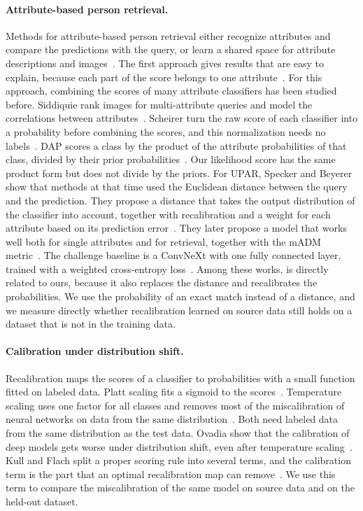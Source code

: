 \documentclass[10pt,twocolumn,letterpaper]{article}
\begin{document}
\paragraph{Attribute-based person retrieval.} Methods for attribute-based person retrieval either recognize attributes and compare the predictions with the query, or learn a shared space for attribute descriptions and images~\cite{upar}. The first approach gives results that are easy to explain, because each part of the score belongs to one attribute~\cite{upar}. For this approach, combining the scores of many attribute classifiers has been studied before. Siddiquie \etal rank images for multi-attribute queries and model the correlations between attributes~\cite{siddiquie}. Scheirer \etal turn the raw score of each classifier into a probability before combining the scores, and this normalization needs no labels~\cite{scheirer}. DAP scores a class by the product of the attribute probabilities of that class, divided by their prior probabilities~\cite{dap}. Our likelihood score has the same product form but does not divide by the priors. For UPAR, Specker and Beyerer show that methods at that time used the Euclidean distance between the query and the prediction. They propose a distance that takes the output distribution of the classifier into account, together with recalibration and a weight for each attribute based on its prediction error~\cite{specker21}. They later propose a model that works well both for single attributes and for retrieval, together with the mADM metric~\cite{specker23}. The challenge baseline is a ConvNeXt with one fully connected layer, trained with a weighted cross-entropy loss~\cite{upar23}. Among these works, \cite{specker21} is directly related to ours, because it also replaces the distance and recalibrates the probabilities. We use the probability of an exact match instead of a distance, and we measure directly whether recalibration learned on source data still holds on a dataset that is not in the training data.

\paragraph{Calibration under distribution shift.} Recalibration maps the scores of a classifier to probabilities with a small function fitted on labeled data. Platt scaling fits a sigmoid to the scores~\cite{platt}. Temperature scaling uses one factor for all classes and removes most of the miscalibration of neural networks on data from the same distribution~\cite{guo}. Both need labeled data from the same distribution as the test data. Ovadia \etal show that the calibration of deep models gets worse under distribution shift, even after temperature scaling~\cite{ovadia}. Kull and Flach split a proper scoring rule into several terms, and the calibration term is the part that an optimal recalibration map can remove~\cite{kull}. We use this term to compare the miscalibration of the same model on source data and on the held-out dataset.
\end{document}
